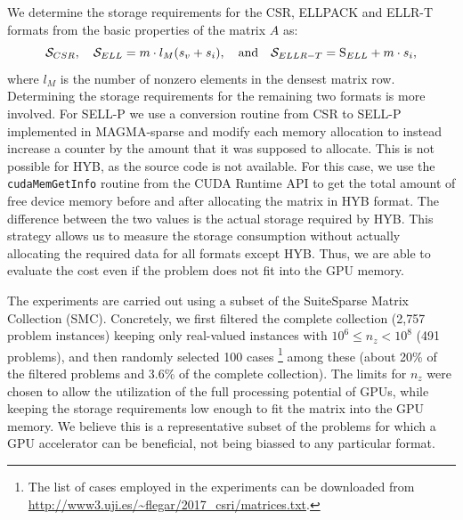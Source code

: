 We determine the storage requirements for the CSR, ELLPACK and ELLR-T formats
from the basic properties of the matrix $A$ as:
\[
    {\cal S}_{CSR}, \quad
    {\cal S}_{ELL}     = m \cdot l_{M}(s_v + s_i), \quad \mbox{\rm and} \quad
    {\cal S}_{ELLR-T}  = \text{S}_{ELL} + m \cdot s_i,
\]
where $l_{M}$ is the number of nonzero elements in the densest matrix row.
Determining the storage requirements for the remaining two formats
is more involved.
For SELL-P we use a conversion routine from CSR to SELL-P implemented in
MAGMA-sparse and modify each memory allocation
to instead increase a counter by the amount that it was supposed to allocate.
This is not possible for HYB, as the source code is not available.
For this case, we use the \texttt{cudaMemGetInfo} routine from the
CUDA Runtime API 
to get the total amount of free device memory
before and after allocating the matrix in HYB format.
The difference between the two values is the actual storage required by HYB.
This strategy allows us to measure the storage consumption
without actually allocating the required data for all formats except HYB.
Thus, we are able to evaluate the cost even if
the problem does not fit into the GPU memory.

The experiments are carried out using a subset
of the SuiteSparse Matrix Collection (SMC).
Concretely, we first filtered the complete collection (2,757 problem instances)
keeping only real-valued instances with $10^6 \leq n_z < 10^8$ (491 problems),
and then randomly selected 100 cases%
\footnote{The list of cases employed in the experiments can be downloaded from
\\ \hspace*{2cm} \url{http://www3.uji.es/~flegar/2017_csri/matrices.txt}.}
among these
(about 20\% of the filtered problems and 3.6\% of the complete collection). 
The limits for $n_z$ were chosen to allow the utilization
of the full processing potential of GPUs,
while keeping the storage requirements low enough
to fit the matrix into the GPU memory.
We believe this is a representative subset of the
problems for which a GPU accelerator can be beneficial,
not being biassed to any particular format.

